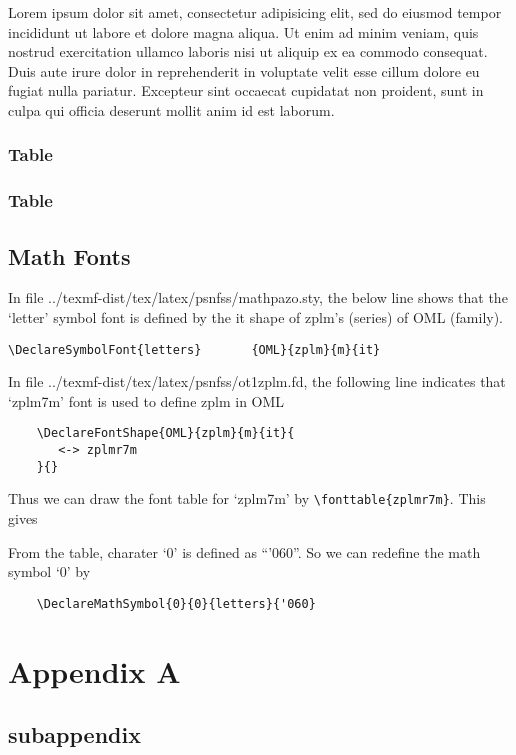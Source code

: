 \documentclass[10pt,a4paper,extrafontsizes,oldfontcommands,oneside]{memoir}
\begin{document}
Lorem ipsum dolor sit amet, consectetur adipisicing elit, sed do eiusmod tempor incididunt ut labore et dolore magna aliqua. Ut enim ad minim veniam, quis nostrud exercitation ullamco laboris nisi ut aliquip ex ea commodo consequat. Duis aute irure dolor in reprehenderit in voluptate velit esse cillum dolore eu fugiat nulla pariatur. Excepteur sint occaecat cupidatat non proident, sunt in culpa qui officia deserunt mollit anim id est laborum.


\subsection{Table} %
\label{sub:table2}

\subsection{Table} %
\label{sub:table3}

\clearpage
\section{Math Fonts}

In file ../texmf-dist/tex/latex/psnfss/mathpazo.sty, the below line shows that the `letter' symbol font is defined by the it shape of zplm's (series) of OML (family).
\begin{verbatim}
\DeclareSymbolFont{letters}       {OML}{zplm}{m}{it}
\end{verbatim}

In file ../texmf-dist/tex/latex/psnfss/ot1zplm.fd, the following line indicates that `zplm7m' font is used to define zplm in OML
\begin{verbatim}
	\DeclareFontShape{OML}{zplm}{m}{it}{
	   <-> zplmr7m
	}{}
\end{verbatim}

Thus we can draw the font table for `zplm7m' by \verb+\fonttable{zplmr7m}+. This gives

From the table, charater `0' is defined as ``'060''. So we can redefine the math symbol `0' by
\begin{verbatim}
	\DeclareMathSymbol{0}{0}{letters}{'060}
\end{verbatim}

\clearpage

\appendix

\chapter{Appendix A} %
\label{chap:appendix_a}

\section{subappendix} %
\label{sec:subappendix}



\backmatter


\printbibliography
\end{document}
